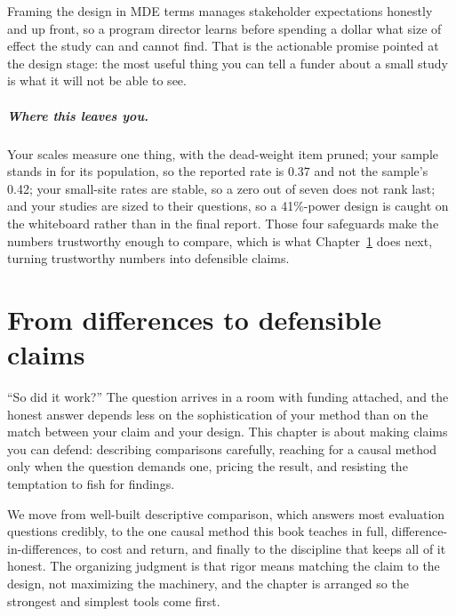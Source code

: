 \documentclass[
    a4paper,
    fontsize=10pt,
    twoside=true,
    numbers=noenddot,
]{kaobook}
\begin{document}
Framing the design in MDE terms manages stakeholder expectations honestly and up front, so a program director learns before spending a dollar what size of effect the study can and cannot find. That is the actionable promise pointed at the design stage: the most useful thing you can tell a funder about a small study is what it will not be able to see.

\paragraph{Where this leaves you.} Your scales measure one thing, with the dead-weight item pruned; your sample stands in for its population, so the reported rate is 0.37 and not the sample's 0.42; your small-site rates are stable, so a zero out of seven does not rank last; and your studies are sized to their questions, so a 41\%-power design is caught on the whiteboard rather than in the final report. Those four safeguards make the numbers trustworthy enough to compare, which is what Chapter~\ref{ch:claims} does next, turning trustworthy numbers into defensible claims.
\chapter{From differences to defensible claims}\label{ch:claims}

\enquote{So did it work?} The question arrives in a room with funding attached, and the honest answer depends less on the sophistication of your method than on the match between your claim and your design. This chapter is about making claims you can defend: describing comparisons carefully, reaching for a causal method only when the question demands one, pricing the result, and resisting the temptation to fish for findings.

We move from well-built descriptive comparison, which answers most evaluation questions credibly, to the one causal method this book teaches in full, difference-in-differences, to cost and return, and finally to the discipline that keeps all of it honest. The organizing judgment is that rigor means matching the claim to the design, not maximizing the machinery, and the chapter is arranged so the strongest and simplest tools come first.
\end{document}
